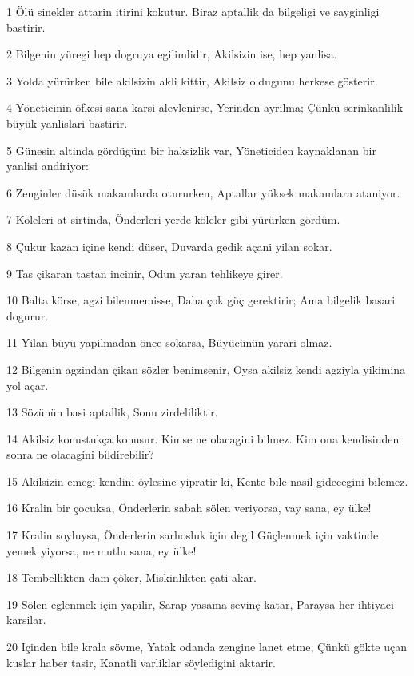 \par 1 Ölü sinekler attarin itirini kokutur. Biraz aptallik da bilgeligi ve sayginligi bastirir.
\par 2 Bilgenin yüregi hep dogruya egilimlidir, Akilsizin ise, hep yanlisa.
\par 3 Yolda yürürken bile akilsizin akli kittir, Akilsiz oldugunu herkese gösterir.
\par 4 Yöneticinin öfkesi sana karsi alevlenirse, Yerinden ayrilma; Çünkü serinkanlilik büyük yanlislari bastirir.
\par 5 Günesin altinda gördügüm bir haksizlik var, Yöneticiden kaynaklanan bir yanlisi andiriyor:
\par 6 Zenginler düsük makamlarda otururken, Aptallar yüksek makamlara ataniyor.
\par 7 Köleleri at sirtinda, Önderleri yerde köleler gibi yürürken gördüm.
\par 8 Çukur kazan içine kendi düser, Duvarda gedik açani yilan sokar.
\par 9 Tas çikaran tastan incinir, Odun yaran tehlikeye girer.
\par 10 Balta körse, agzi bilenmemisse, Daha çok güç gerektirir; Ama bilgelik basari dogurur.
\par 11 Yilan büyü yapilmadan önce sokarsa, Büyücünün yarari olmaz.
\par 12 Bilgenin agzindan çikan sözler benimsenir, Oysa akilsiz kendi agziyla yikimina yol açar.
\par 13 Sözünün basi aptallik, Sonu zirdeliliktir.
\par 14 Akilsiz konustukça konusur. Kimse ne olacagini bilmez. Kim ona kendisinden sonra ne olacagini bildirebilir?
\par 15 Akilsizin emegi kendini öylesine yipratir ki, Kente bile nasil gidecegini bilemez.
\par 16 Kralin bir çocuksa, Önderlerin sabah sölen veriyorsa, vay sana, ey ülke!
\par 17 Kralin soyluysa, Önderlerin sarhosluk için degil Güçlenmek için vaktinde yemek yiyorsa, ne mutlu sana, ey ülke!
\par 18 Tembellikten dam çöker, Miskinlikten çati akar.
\par 19 Sölen eglenmek için yapilir, Sarap yasama sevinç katar, Paraysa her ihtiyaci karsilar.
\par 20 Içinden bile krala sövme, Yatak odanda zengine lanet etme, Çünkü gökte uçan kuslar haber tasir, Kanatli varliklar söyledigini aktarir.

